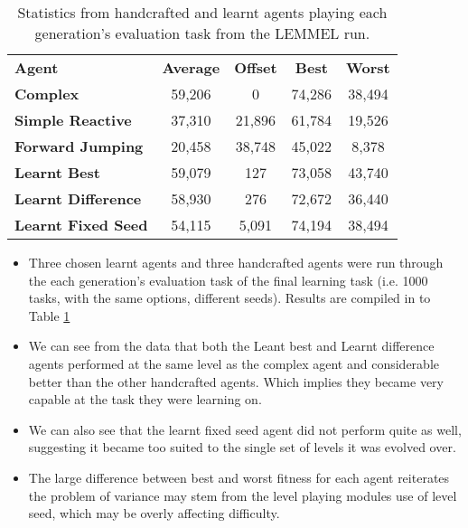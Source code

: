 \begin{table}
  \begin{adjustwidth}{-0cm}{-0cm}
  \begin{center} \small
    \begin{tabular}{ | l | c | c | c | c |}
    \hline
    \textbf{Agent} & \textbf{Average} & \textbf{Offset} & \textbf{Best} & \textbf{Worst} \TBstrut \\ \thickhline
    \textbf{Complex} & 59,206 & 0 & 74,286 & 38,494  \\ \hline
    \textbf{Simple Reactive} & 37,310 & 21,896 & 61,784 & 19,526 \\ \hline
    \textbf{Forward Jumping} & 20,458 & 38,748 & 45,022 & 8,378 \\ \thickhline
    \textbf{Learnt Best} & 59,079 & 127 & 73,058 & 43,740  \\ \hline
    \textbf{Learnt Difference} & 58,930 & 276 & 72,672 & 36,440  \\ \hline
    \textbf{Learnt Fixed Seed} & 54,115 & 5,091 & 74,194 & 38,494  \\ \hline
    \end{tabular}
  \end{center}
  \end{adjustwidth}
  \caption{\small Statistics from handcrafted and learnt agents playing each generation's evaluation task from the LEMMEL run.}
  \label{tab:learnrunagents}
\end{table}

\begin{itemize}
\item Three chosen learnt agents and three handcrafted agents were run through the each generation's evaluation task of the final learning task (i.e. 1000 tasks, with the same options, different seeds). Results are compiled in to Table \ref{tab:learnrunagents}
\item We can see from the data that both the Leant best and Learnt difference agents performed at the same level as the complex agent and considerable better than the other handcrafted agents. Which implies they became very capable at the task they were learning on.
\item We can also see that the learnt fixed seed agent did not perform quite as well, suggesting it became too suited to the single set of levels it was evolved over.
\item The large difference between best and worst fitness for each agent reiterates the problem of variance may stem from the level playing modules use of level seed, which may be overly affecting difficulty.
\end{itemize}

